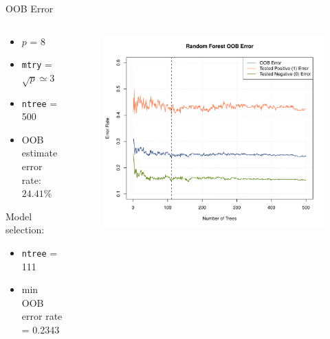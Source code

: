 \begin{frame}{OOB Error}
\begin{columns}
\begin{column}{0.35\textwidth}

{\footnotesize \begin{itemize}
	\item $p$ = 8
	\item \texttt{mtry} = $\sqrt{p} \simeq 3$
	\item \texttt{ntree} = 500
	\item OOB estimate error rate: $24.41\%$
\end{itemize}}

\vspace{0.5cm}

\; Model selection:
{\footnotesize \begin{itemize}
	\item \texttt{ntree} = 111
	\item min OOB error rate = 0.2343
\end{itemize}}

\end{column}
\begin{column}{0.75\textwidth}
\begin{figure}
\includegraphics[width=1.05\columnwidth]{./Figures/forest/diabete_forest_error3.pdf}
\end{figure}
\end{column}
\end{columns}
\end{frame}

